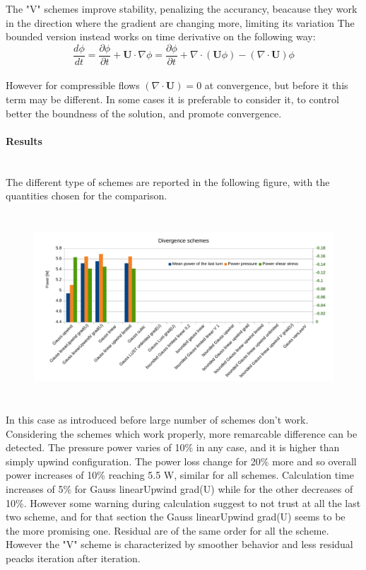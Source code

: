 \documentclass[a4paper,12pt]{article}
\begin{document}
The "V" schemes improve stability, penalizing the accurancy, beacause they work in the direction where the gradient are changing more, limiting its variation
The bounded version instead works on time derivative on the following way:
\begin{equation}
\frac{d \phi}{dt} = \frac{\partial \phi}{\partial t} + \bm{U} \cdot \nabla \phi = \frac{\partial \phi}{\partial t} + \nabla \cdot (\bm{U} \phi) - ( \nabla \cdot \bm{U} ) \phi
\end{equation}
\\ However for compressible flows $( \nabla \cdot \bm{U} ) = 0 $ at convergence, but before it this term may be different. In some cases it is preferable to consider it, to control better the boundness of the solution, and promote convergence.


\paragraph{Results} \mbox{}\\
The different type of schemes are reported in the following figure, with the quantities chosen for the comparison. 
\begin{figure}[H]
\centering
\includegraphics[height=7cm]{images/schemes/divschems-results.pdf}
\end{figure}
In this case as introduced before large number of schemes don't work. Considering the schemes which work properly, more remarcable difference can be detected.
The pressure power varies of 10\% in any case, and it is higher than simply upwind configuration. The power loss change for 20\% more and so overall power increases of 10\% reaching 5.5 W, similar for all schemes. Calculation time increases of 5\% for Gauss linearUpwind grad(U) while for the other decreases of 10\%. However some warning during calculation suggest to not trust at all the last two scheme, and for that section the Gauss linearUpwind grad(U) seems to be the more promising one. Residual are of the same order for all the scheme. However the "V" scheme is characterized by smoother behavior and less residual peacks iteration after iteration. %
\end{document}
